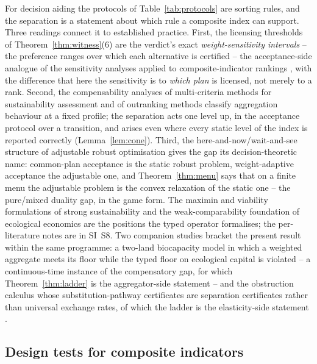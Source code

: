 \documentclass[preprint,11pt,authoryear]{elsarticle}
\theoremstyle{definition}
\theoremstyle{remark}
\begin{document}
For decision aiding the protocols of Table~\ref{tab:protocols} are sorting rules, and the separation is a statement about which rule a composite index can support. Three readings connect it to established practice. First, the licensing thresholds of Theorem~\ref{thm:witness}(6) are the verdict's exact \emph{weight-sensitivity intervals} -- the preference ranges over which each alternative is certified -- the acceptance-side analogue of the sensitivity analyses applied to composite-indicator rankings \citep{Nardo2008,Becker2017}, with the difference that here the sensitivity is to \emph{which plan} is licensed, not merely to a rank. Second, the compensability analyses of multi-criteria methods for sustainability assessment \citep{Cinelli2014} and of outranking methods \citep{Schar2025} classify aggregation behaviour at a fixed profile; the separation acts one level up, in the acceptance protocol over a transition, and arises even where every static level of the index is reported correctly (Lemma~\ref{lem:cone}). Third, the here-and-now/wait-and-see structure of adjustable robust optimisation \citep{BenTal2004} gives the gap its decision-theoretic name: common-plan acceptance is the static robust problem, weight-adaptive acceptance the adjustable one, and Theorem~\ref{thm:menu} says that on a finite menu the adjustable problem is the convex relaxation of the static one -- the pure/mixed duality gap, in the game form. The maximin and viability formulations of strong sustainability \citep{Martinet2011,CairnsMartinet2014,DoyenGajardo2020} and the weak-comparability foundation of ecological economics \citep{MartinezAlier1998} are the positions the typed operator formalises; the per-literature notes are in SI~S8. Two companion studies bracket the present result within the same programme: a two-land biocapacity model in which a weighted aggregate meets its floor while the typed floor on ecological capital is violated -- a continuous-time instance of the compensatory gap, for which Theorem~\ref{thm:ladder} is the aggregator-side statement \citep{Abaee2026ecomod} -- and the obstruction calculus whose substitution-pathway certificates are separation certificates rather than universal exchange rates, of which the ladder is the elasticity-side statement \citep{Abaee2026obs}.

\subsection{Design tests for composite indicators}\label{sec:design}
\end{document}
